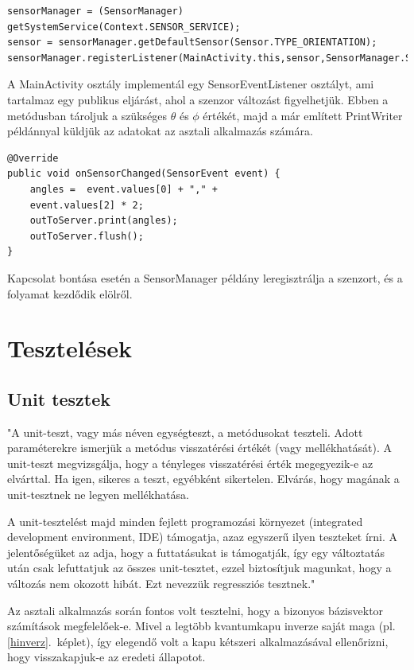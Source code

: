 \documentclass[
]{thesis-ekf}
\theoremstyle{definition}
\theoremstyle{remark}
\begin{document}
\begin{lstlisting}[caption={Szenzor létrehozása és regisztrálása}]
sensorManager = (SensorManager) getSystemService(Context.SENSOR_SERVICE);
sensor = sensorManager.getDefaultSensor(Sensor.TYPE_ORIENTATION);
sensorManager.registerListener(MainActivity.this,sensor,SensorManager.SENSOR_DELAY_NORMAL);
\end{lstlisting}

A MainActivity osztály implementál egy SensorEventListener osztályt, ami tartalmaz egy publikus eljárást, ahol a szenzor változást figyelhetjük. Ebben a metódusban tároljuk a szükséges $\theta$ és $\phi$ értékét, majd a már említett PrintWriter példánnyal küldjük az adatokat az asztali alkalmazás számára.

\begin{lstlisting}[caption={Szenzor adatok gyűjtése és küldése az asztali alkalmazás számára}]
@Override
public void onSensorChanged(SensorEvent event) {
	angles =  event.values[0] + "," +
	event.values[2] * 2;
	outToServer.print(angles);
	outToServer.flush();
}
\end{lstlisting}

Kapcsolat bontása esetén a SensorManager példány leregisztrálja a szenzort, és a folyamat kezdődik elölről.

\section{Tesztelések}

\subsection{Unit tesztek}
"A unit-teszt, vagy más néven egységteszt, a metódusokat teszteli. Adott paraméterekre ismerjük a
metódus visszatérési értékét (vagy mellékhatását). A unit-teszt megvizsgálja, hogy a tényleges
visszatérési érték megegyezik-e az elvárttal. Ha igen, sikeres a teszt, egyébként sikertelen. Elvárás,
hogy magának a unit-tesztnek ne legyen mellékhatása.

A unit-tesztelést majd minden fejlett programozási környezet (integrated development environment,
IDE) támogatja, azaz egyszerű ilyen teszteket írni. A jelentőségüket az adja, hogy a futtatásukat is
támogatják, így egy változtatás után csak lefuttatjuk az összes unit-tesztet, ezzel biztosítjuk
magunkat, hogy a változás nem okozott hibát. Ezt nevezzük regressziós tesztnek."

Az asztali alkalmazás során fontos volt tesztelni, hogy a bizonyos bázisvektor számítások megfelelőek-e. Mivel a legtöbb kvantumkapu inverze saját maga (pl. \ref{hinverz}.~képlet), így elegendő volt a kapu kétszeri alkalmazásával ellenőrizni, hogy visszakapjuk-e az eredeti állapotot.
\end{document}
